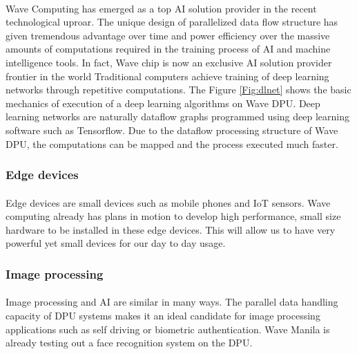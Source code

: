 \paragraph{}
Wave Computing has emerged as a top AI solution provider in the recent technological uproar. The unique design of parallelized data flow structure has given tremendous advantage over time and power efficiency over the massive amounts of computations required in the training process of AI and machine intelligence tools. In fact, Wave chip is now an exclusive AI solution provider frontier in the world Traditional computers achieve training of deep learning networks through repetitive computations. The Figure \ref{Fig:dlnet} shows the basic mechanics of execution of a deep learning algorithms on Wave DPU. Deep learning networks are naturally dataflow graphs programmed using deep learning software such as Tensorflow. Due to the dataflow processing structure of Wave DPU, the computations can be mapped and the process executed much faster.

\subsubsection*{Edge devices}
\paragraph{}
Edge devices are small devices such as mobile phones and IoT sensors. Wave computing already has plans in motion to develop high performance, small size hardware to be installed in these edge devices. This will allow us to have very powerful yet small devices for our day to day usage.

\subsubsection*{Image processing}
\paragraph{}
Image processing and AI are similar in many ways. The parallel data handling capacity of DPU systems makes it an ideal candidate for image processing applications such as self driving or biometric authentication. Wave Manila is already testing out a face recognition system on the DPU.

